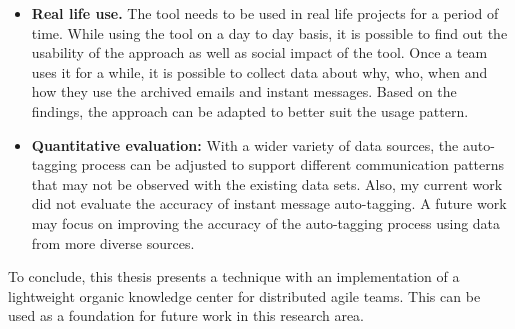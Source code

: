 \begin{itemize}
	\item \textbf{Real life use.} The tool needs to be used in real life projects for a period of time. While using the tool on a day to day basis, it is possible to find out the usability of the approach as well as social impact of the tool. Once a team uses it for a while, it is possible to collect data about why, who, when and how they use the archived emails and instant messages. Based on the findings, the approach can be adapted to better suit the usage pattern.
	
	\item \textbf{Quantitative evaluation:} With a wider variety of data sources, the auto-tagging process can be adjusted to support different communication patterns that may not be observed with the existing data sets. Also, my current work did not evaluate the accuracy of instant message auto-tagging. A future work may focus on improving the accuracy of the auto-tagging process using data from more diverse sources.	
\end{itemize}	

To conclude, this thesis presents a technique with an implementation of a lightweight organic knowledge center for distributed agile teams. This can be used as a foundation for future work in this research area.








